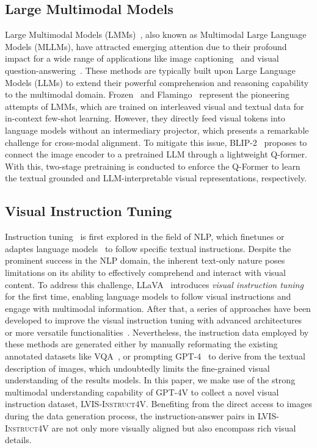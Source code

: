 \documentclass{article}
\newcommand{\dataname}{\textsc{LVIS-Instruct4V}\xspace}
\begin{document}
\subsection{Large Multimodal Models}
Large Multimodal Models (LMMs)~\cite{alayrac2022flamingo,chowdhery2022palm,li2023multimodal,li2023blip,driess2023palm}, also known as Multimodal Large Language Models (MLLMs), have attracted emerging attention due to their profound impact for a wide range of applications like image captioning~\cite{you2016image,yao2017boosting} and visual question-answering~\cite{antol2015vqa,shih2016look}. These methods are typically built upon Large Language Models (LLMs) to extend their powerful comprehension and reasoning capability to the multimodal domain. Frozen~\cite{tsimpoukelli2021multimodal} and Flamingo~\cite{alayrac2022flamingo} represent the pioneering attempts of LMMs, which are trained on interleaved visual and textual data for in-context few-shot learning. However, they directly feed visual tokens into language models without an intermediary projector, which presents a remarkable challenge for cross-modal alignment. To mitigate this issue, BLIP-2~\cite{li2023blip} proposes to connect the image encoder to a pretrained LLM through a lightweight Q-former. With this, two-stage pretraining is conducted to enforce the Q-Former to learn the textual grounded and LLM-interpretable visual representations, respectively.

\subsection{Visual Instruction Tuning} 
Instruction tuning~\cite{ouyang2022training,wang2022self,wang2022benchmarking} is first explored in the field of NLP, which finetunes or adaptes language models~\cite{brown2020language,raffel2020exploring,zhang2022opt,touvron2023llama} to follow specific textual instructions. Despite the prominent success in the NLP domain, the inherent text-only nature poses limitations on its ability to effectively comprehend and interact with visual content. To address this challenge, LLaVA~\cite{li2023llava} introduces \textit{visual instruction tuning} for the first time, enabling language models to follow visual instructions and engage with multimodal information. After that, a series of approaches have been developed to improve the visual instruction tuning with advanced architectures~\cite{idefics,dai2023instructblip,bai2023qwen} or more versatile functionalities~\cite{peng2023kosmos,zhu2023minigpt,lai2023lisa}. Nevertheless, the instruction data employed by these methods are generated either by manually reformating the existing annotated datasets like VQA~\cite{goyal2017vqav2}, or prompting GPT-4~\cite{gpt4} to derive from the textual description of images, which undoubtedly limits the fine-grained visual understanding of the results models. In this paper, we make use of the strong multimodal understanding capability of GPT-4V to collect a novel visual instruction dataset, \dataname. Benefiting from the direct access to images during the data generation process,  the instruction-answer pairs in \dataname are not only more visually aligned but also encompass rich visual details.
\end{document}
